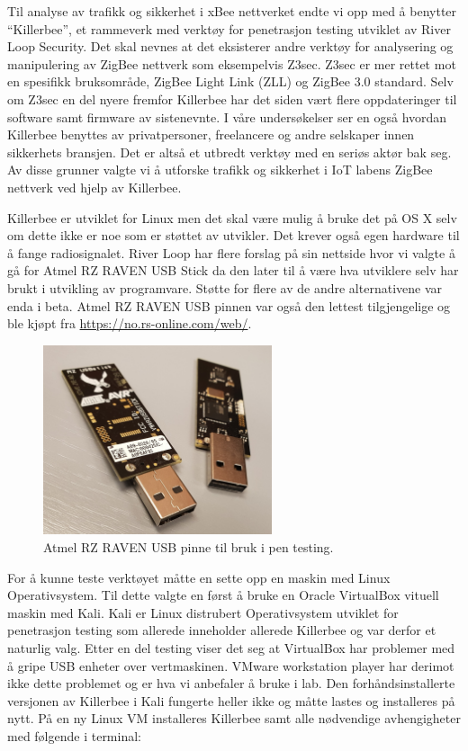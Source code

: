 \documentclass{article}
\begin{document}
Til analyse av trafikk og sikkerhet i xBee nettverket endte vi opp med å benytter “Killerbee”, et rammeverk med verktøy for penetrasjon testing utviklet av River Loop Security\cite{riverloop}. Det skal nevnes at det eksisterer andre verktøy for analysering og manipulering av ZigBee nettverk som eksempelvis Z3sec. Z3sec er mer rettet mot en spesifikk bruksområde, ZigBee Light Link (ZLL)\cite{zigbeesecure} og ZigBee 3.0 standard. Selv om Z3sec en del nyere fremfor Killerbee har det siden vært flere oppdateringer til software samt firmware av sistenevnte. I våre undersøkelser ser en også hvordan Killerbee benyttes av privatpersoner, freelancere og andre selskaper innen sikkerhets bransjen.  Det er altså et utbredt verktøy med en seriøs aktør bak seg. Av disse grunner valgte vi å utforske trafikk og sikkerhet i IoT labens ZigBee nettverk ved hjelp av Killerbee. 

Killerbee er utviklet for Linux men det skal være mulig å bruke det på OS X selv om dette ikke er noe som er støttet av utvikler. Det krever også egen hardware til å fange radiosignalet. River Loop har flere forslag på sin nettside hvor vi valgte å gå for Atmel RZ RAVEN USB Stick da den later til å være hva utviklere selv har brukt i utvikling av programvare. Støtte for flere av de andre alternativene var enda i beta. Atmel RZ RAVEN USB pinnen var også den lettest tilgjengelige og ble kjøpt fra \url{https://no.rs-online.com/web/}. 

\begin{figure} [!ht]
  \centering
      \includegraphics[width=0.6\textwidth]{usbstick}
  \caption{Atmel RZ RAVEN USB pinne til bruk i pen testing.}
\end{figure}

For å kunne teste verktøyet måtte en sette opp en maskin med Linux Operativsystem. Til dette valgte en først å bruke en Oracle VirtualBox vituell maskin med Kali. Kali er Linux distrubert Operativsystem\cite{kali} utviklet for penetrasjon testing som allerede inneholder allerede Killerbee og var derfor et naturlig valg. Etter en del testing viser det seg at VirtualBox har problemer med å gripe USB enheter over vertmaskinen. VMware workstation player har derimot ikke dette problemet og er hva vi anbefaler å bruke i lab. Den forhåndsinstallerte versjonen av Killerbee i Kali fungerte heller ikke og måtte lastes og installeres på nytt. På en ny Linux VM installeres Killerbee samt alle nødvendige avhengigheter med følgende i terminal:
\end{document}
